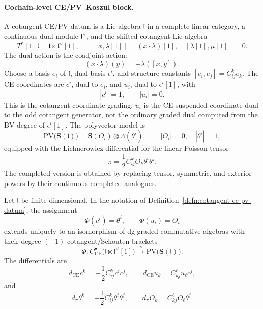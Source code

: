 \paragraph{Cochain-level CE/PV--Koszul block.}

\begin{defn}\label{defn:cotangent-ce-pv-datum}
  A cotangent CE/PV datum is a Lie algebra \(\mathfrak l\) in a
  complete linear category, a continuous dual module
  \(\mathfrak l^\vee\), and the shifted cotangent Lie algebra
	  \[
	    T^*[1]\mathfrak l=\mathfrak l\ltimes\mathfrak l^\vee[1],
	    \qquad
	    [x,\lambda[1]]=(x\cdot\lambda)[1],\quad
	    [\lambda[1],\mu[1]]=0 .
	  \]
  The dual action is the coadjoint action:
  \[
    (x\cdot\lambda)(y)=-\lambda([x,y]).
  \]
  Choose a basis \(e_i\) of \(\mathfrak l\), dual basis
  \(\epsilon^i\), and structure constants
  \([e_i,e_j]=C^k_{ij}e_k\).  The CE coordinates are \(c^i\), dual to
  \(e_i\), and \(u_i\), dual to \(\epsilon^i[1]\), with
  \[
    |c^i|=1,\qquad |u_i|=0 .
  \]
  This is the cotangent-coordinate grading: \(u_i\) is the
  CE-suspended coordinate dual to the odd cotangent generator, not the
  ordinary graded dual computed from the BV degree of \(\epsilon^i[1]\).
  The polyvector model is
  \[
    \mathrm{PV}\bigl(\mathbf S(\mathfrak l)\bigr)
    =
    \mathbf S(O_i)\otimes\Lambda(\theta^i),
    \qquad |O_i|=0,\quad |\theta^i|=1,
  \]
  equipped with the Lichnerowicz differential for the linear Poisson
  tensor
  \[
    \pi=\frac12 C^k_{ij}O_k\theta^i\theta^j .
  \]
  The completed version is obtained by replacing tensor, symmetric, and
  exterior powers by their continuous completed analogues.
\end{defn}

\begin{thm}\label{thm:finite-cotangent-ce-pv-identity}
  Let \(\mathfrak l\) be finite-dimensional.  In the notation of
  Definition~\ref{defn:cotangent-ce-pv-datum}, the assignment
  \[
    \Phi(c^i)=\theta^i,\qquad \Phi(u_i)=O_i
  \]
  extends uniquely to an isomorphism of dg graded-commutative algebras
  with their degree-\((-1)\) cotangent/Schouten brackets
  \[
    \Phi\colon
    C^\bullet_{\mathrm{CE}}\bigl(\mathfrak l\ltimes\mathfrak l^\vee[1]\bigr)
    \xrightarrow{\ \sim\ }
    \mathrm{PV}\bigl(\mathbf S(\mathfrak l)\bigr).
  \]
  The differentials are
  \[
    d_{\mathrm{CE}}c^k=-\frac12 C^k_{ij}c^ic^j,\qquad
    d_{\mathrm{CE}}u_k=C^\ell_{kj}u_\ell c^j,
  \]
  and
  \[
    d_\pi\theta^k=-\frac12 C^k_{ij}\theta^i\theta^j,\qquad
    d_\pi O_k=C^\ell_{kj}O_\ell\theta^j.
  \]
\end{thm}

